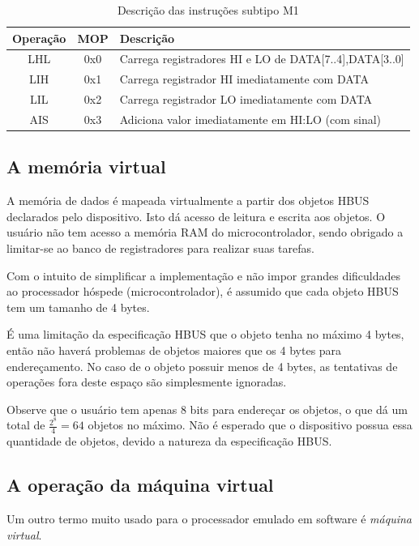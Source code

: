 \documentclass[11pt]{report}
\begin{document}
\begin{table}[H]
\caption{Descrição das instruções subtipo M1}
\begin{tabular}{c c p{10cm}}
\hline
Operação 	& 	MOP 		&	Descrição\\
\hline
LHL			&	0x0			&	Carrega registradores HI e LO de DATA[7..4],DATA[3..0]\\
LIH			&	0x1			&	Carrega registrador HI imediatamente com DATA\\
LIL			&	0x2			&	Carrega registrador LO imediatamente com DATA\\
AIS			&	0x3			&	Adiciona valor imediatamente em HI:LO (com sinal)\\

\hline
\end{tabular}
\label{tab:winst}
\end{table}	 

\subsection{A memória virtual}
A memória de dados é mapeada virtualmente a partir dos objetos HBUS declarados pelo dispositivo. Isto dá acesso de leitura e escrita aos objetos. O usuário não tem acesso a memória RAM do microcontrolador, sendo obrigado a limitar-se ao banco de registradores para realizar suas tarefas.

Com o intuito de simplificar a implementação e não impor grandes dificuldades ao processador hóspede (microcontrolador), é assumido que cada objeto HBUS tem um tamanho de 4 bytes.

É uma limitação da especificação HBUS que o objeto tenha no máximo 4 bytes, então não haverá problemas de objetos maiores que os 4 bytes para endereçamento. No caso de o objeto possuir menos de 4 bytes, as tentativas de operações fora deste espaço são simplesmente ignoradas.

Observe que o usuário tem apenas 8 bits para endereçar os objetos, o que dá um total de $\frac{2^8}{4} = 64$ objetos no máximo. Não é esperado que o dispositivo possua essa quantidade de objetos, devido a natureza da especificação HBUS.

\subsection{A operação da máquina virtual}

Um outro termo muito usado para o processador emulado em software é \textit{máquina virtual}.
\end{document}
